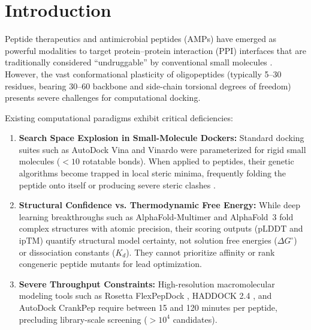 \documentclass[10pt,twocolumn]{article}
\begin{document}
\begin{abstract}
\noindent \textbf{Availability and Implementation:} AMP-Screen is implemented in Python ($\ge 3.9$) and PyTorch under the permissive MIT license. Source code, extensive documentation, 63 unit and integration tests, pre-trained ensemble model weights, and reproduction benchmark datasets are freely available on GitHub at \url{https://github.com/Your-Random-Variable/amp-screen} (installable via \texttt{pip install git+https://github.com/Your-Random-Variable/amp-screen.git} and GitHub release packages; PyPI publication planned upon peer-reviewed acceptance).\\[4pt]
\noindent \textbf{Contact:} \texttt{ankur.singh.res@gmail.com}\\[4pt]
\noindent \textbf{Supplementary Information:} Supplementary data are available at \textit{Bioinformatics} online.
\end{abstract}

\section{Introduction}
Peptide therapeutics and antimicrobial peptides (AMPs) have emerged as powerful modalities to target protein--protein interaction (PPI) interfaces that are traditionally considered ``undruggable'' by conventional small molecules \cite{Muttenthaler2021}. However, the vast conformational plasticity of oligopeptides (typically 5--30 residues, bearing 30--60 backbone and side-chain torsional degrees of freedom) presents severe challenges for computational docking.

Existing computational paradigms exhibit critical deficiencies:
\begin{enumerate}
    \item \textbf{Search Space Explosion in Small-Molecule Dockers:} Standard docking suites such as AutoDock Vina \cite{Trott2010} and Vinardo \cite{Quiroga2016} were parameterized for rigid small molecules ($<10$ rotatable bonds). When applied to peptides, their genetic algorithms become trapped in local steric minima, frequently folding the peptide onto itself or producing severe steric clashes \cite{London2011}.
    \item \textbf{Structural Confidence vs. Thermodynamic Free Energy:} While deep learning breakthroughs such as AlphaFold-Multimer \cite{Evans2022} and AlphaFold~3 \cite{Abramson2024} fold complex structures with atomic precision, their scoring outputs ($\text{pLDDT}$ and $\text{ipTM}$) quantify structural model certainty, not solution free energies ($\Delta G^\circ$) or dissociation constants ($K_d$). They cannot prioritize affinity or rank congeneric peptide mutants for lead optimization.
    \item \textbf{Severe Throughput Constraints:} High-resolution macromolecular modeling tools such as Rosetta FlexPepDock \cite{London2011}, HADDOCK 2.4 \cite{Honorato2021}, and AutoDock CrankPep \cite{Zhang2019} require between 15 and 120 minutes per peptide, precluding library-scale screening ($>10^4$ candidates).
\end{enumerate}
\end{document}
